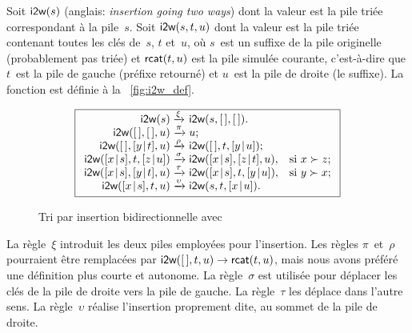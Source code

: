 Soit \(\textsf{i2w}(s)\) (anglais: \emph{insertion
  going two ways}) dont la valeur est la pile triée correspondant à la
pile~\(s\). Soit \(\textsf{i2w}(s,t,u)\) dont la
valeur est la pile triée contenant toutes les clés de~\(s\), \(t\)
et~\(u\), où \(s\)~est un suffixe de la pile originelle (probablement
pas triée) et \(\textsf{rcat}(t,u)\) est la pile
simulée courante, c'est-à-dire que \(t\)~est la pile de gauche
(préfixe retourné) et \(u\)~est la pile de droite (le suffixe). La
fonction  est définie à la
\fig~\vref{fig:i2w_def}.
\begin{figure}[b]
\begin{equation*}
\boxed{%
\begin{array}{r@{\;}l@{\;}ll}
\fun{i2w}(s)         & \xrightarrow{\smash{\xi}}
                     & \fun{i2w}(s,\el,\el).\\
\fun{i2w}(\el,\el,u) & \xrightarrow{\smash{\pi}}
                     & u;\\
\fun{i2w}(\el,\cons{y}{t},u)
                     & \xrightarrow{\smash{\rho}}
                     & \fun{i2w}(\el,t,\cons{y}{u});\\
\fun{i2w}(\cons{x}{s},t,\cons{z}{u})
                     & \xrightarrow{\smash{\sigma}}
                     & \fun{i2w}(\cons{x}{s},\cons{z}{t},u),
                     & \text{si \(x \succ z\)};\\
\fun{i2w}(\cons{x}{s},\cons{y}{t},u)
                     & \xrightarrow{\smash{\tau}}
                     & \fun{i2w}(\cons{x}{s},t,\cons{y}{u}),
                     & \text{si \(y \succ x\)};\\
\fun{i2w}(\cons{x}{s},t,u)
                     & \xrightarrow{\smash{\upsilon}}
                     & \fun{i2w}(s,t,\cons{x}{u}).
\end{array}}
\end{equation*}
\caption{Tri par insertion bidirectionnelle avec }
\label{fig:i2w_def}
\end{figure}
La règle~\(\xi\) introduit les deux piles employées pour
l'insertion. Les règles \(\pi\)~et~\(\rho\) pourraient être remplacées
par \(\textsf{i2w}([\,],t,u) \rightarrow \textsf{rcat}(t,u)\), mais nous
avons préféré une définition plus courte et autonome. La
règle~\(\sigma\) est utilisée pour déplacer les clés de la pile de
droite vers la pile de gauche. La règle~\(\tau\) les déplace dans
l'autre sens. La règle~\(\upsilon\) réalise l'insertion proprement
dite, au sommet de la pile de droite.

